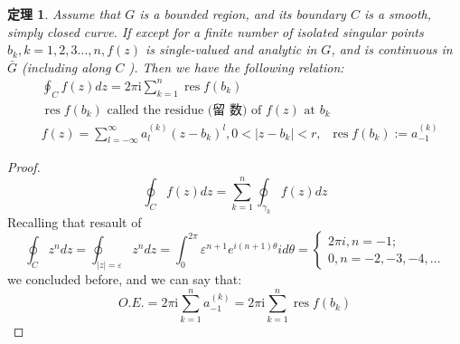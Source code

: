 \documentclass[10pt, a4paper, oneside]{ctexbook}
\newtheorem{theorem}{定理}[section]
\begin{document}
\begin{theorem}
    Assume that $G$ is a bounded region, and its boundary $C$ is a smooth, simply closed curve. If except for a finite number of isolated singular points $b_{k}, k=1,2,3 \ldots, n, f(z)$ is single-valued and analytic in $G$, and is continuous in $\bar{G}$ (including along $C$ ). Then we have the following relation:
    \begin{align*}
        &\oint_{C} f(z) d z=2 \pi \mathrm{i} \sum_{k=1}^{n} \operatorname{res} f\left(b_{k}\right) \\
        & \operatorname{res} f\left(b_{k}\right) \text { called the residue (留 数) of } f(z) \text { at } b_{k} \\
        & f(z)=\sum_{l=-\infty}^{\infty} a_{l}^{(k)}\left(z-b_{k}\right)^{l}, 0<\left|z-b_{k}\right|<r,\;\; \operatorname{res} f(b_k) := a_{-1}^{(k)}
    \end{align*}
\end{theorem}
\begin{proof}
    \begin{equation*}
        \oint_{C} f(z) d z=\sum_{k=1}^{n} \oint_{\gamma_{k}} f(z) d z
    \end{equation*}
    Recalling that resault of
    \begin{equation*}
        \oint_{C} z^{n} d z=\oint_{|z|=\varepsilon} z^{n} d z=\int_{0}^{2 \pi} \varepsilon^{n+1} e^{i(n+1) \theta} i d \theta=\left\{\begin{array}{l}
        2 \pi i, n=-1 ; \\
        0, n=-2,-3,-4, \ldots
    \end{array}\right.
\end{equation*}
    we concluded before, and we can say that:
    \begin{equation*}
       O.E. =  2 \pi \mathrm{i} \sum_{k=1}^{n} a_{-1}^{(k)}=2 \pi \mathrm{i} \sum_{k=1}^{n} \operatorname{res} f\left(b_{k}\right)
    \end{equation*}
\end{proof}
\end{document}
